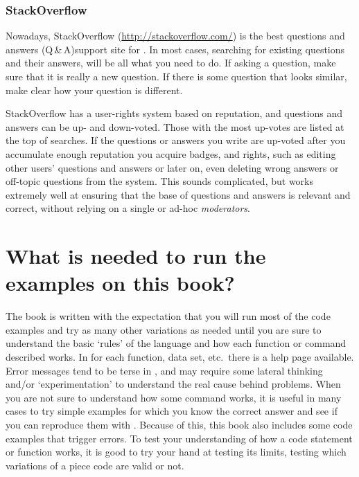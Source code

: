 \documentclass[krantz2,ChapterTOCs]{krantz}\usepackage{knitr}
\begin{document}
\subsubsection{StackOverflow}

Nowadays, StackOverflow (\url{http://stackoverflow.com/}) is the best questions and answers (Q\,\&\,A)support site for . In most cases, searching for existing questions and their answers, will be all what you need to do. If asking a question, make sure that it is really a new question. If there is some question that looks similar, make clear how your question is different.

StackOverflow has a user-rights system based on reputation, and questions and answers can be up- and down-voted. Those with the most up-votes are listed at the top of searches. If the questions or answers you write are up-voted after you accumulate enough reputation you acquire badges, and rights, such as editing other users' questions and answers or later on, even deleting wrong answers or off-topic questions from the system. This sounds complicated, but works extremely well at ensuring that the base of questions and answers is relevant and correct, without relying on a single or ad-hoc \emph{moderators}.

\section{What is needed to run the examples on this book?}

The book is written with the expectation that you will run most of the code examples and try as many other variations as needed until you are sure to understand the basic `rules' of the \Rpgrm language and how each function or command described works. In \Rpgrm for each function, data set, etc.\ there is a help page available. Error messages tend to be terse in \Rpgrm, and may require some lateral thinking and/or `experimentation' to understand the real cause behind problems. When you are not sure to understand how some command works, it is useful in many cases to try simple examples for which you know the correct answer and see if you can reproduce them with \Rpgrm. Because of this, this book also includes some code examples that trigger errors. To test your understanding of how a code statement or function works, it is good to try your hand at testing its limits, testing which variations of a piece code are valid or not.
\end{document}
